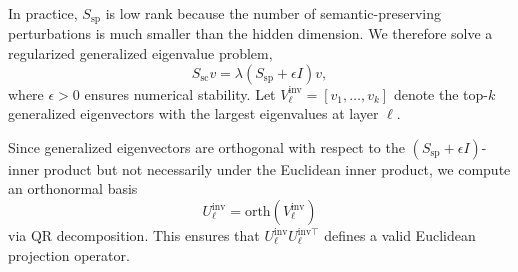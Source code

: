 




In practice, $S_{\mathrm{sp}}$ is low rank because the number of semantic-preserving perturbations is much smaller than the hidden dimension. We therefore solve a regularized generalized eigenvalue problem,
\[
S_{\mathrm{sc}} v = \lambda (S_{\mathrm{sp}} + \epsilon I)v,
\]
where $\epsilon > 0$ ensures numerical stability. Let $V_{\ell}^{\mathrm{inv}} = [v_1, \ldots, v_k]$ denote the top-$k$ generalized eigenvectors with the largest eigenvalues at layer $\ell$. 

Since generalized eigenvectors are orthogonal with respect to the $(S_{\mathrm{sp}} + \epsilon I)$-inner product but not necessarily under the Euclidean inner product, we compute an orthonormal basis
\[
U_\ell^{\mathrm{inv}} = \mathrm{orth}(V_\ell^{\mathrm{inv}})
\]
via QR decomposition. This ensures that $U_\ell^{\mathrm{inv}} U_\ell^{\mathrm{inv}\top}$ defines a valid Euclidean projection operator.

